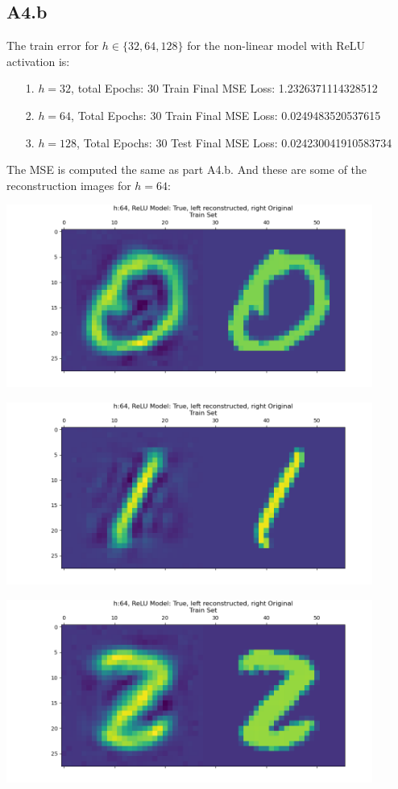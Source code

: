 \documentclass[]{article}
\begin{document}
    \subsection*{A4.b}
        The train error for $h\in\{32, 64, 128\}$ for the non-linear model with ReLU activation is: 
        \begin{enumerate}
            \item[1.] $h=32$, total Epochs: 30 Train Final MSE Loss: 1.2326371114328512
            \item[2.] $h=64$, Total Epochs: 30 Train Final MSE Loss: 0.0249483520537615
            \item[3.] $h=128$, Total Epochs: 30 Test Final MSE Loss: 0.024230041910583734
        \end{enumerate}
        The MSE is computed the same as part A4.b. And these are some of the reconstruction images for $h=64$: 
        \begin{center}
            \includegraphics*[width=12cm]{A4plots/06-53-51-h-64-nonlin-digit-0.png}
        \end{center}
        \begin{center}
            \includegraphics*[width=12cm]{A4plots/06-53-51-h-64-nonlin-digit-1.png}
        \end{center}
        \begin{center}
            \includegraphics*[width=12cm]{A4plots/06-53-51-h-64-nonlin-digit-2.png}
        \end{center}
\end{document}
